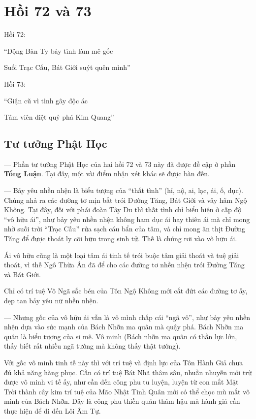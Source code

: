 \chapter{Hồi 72 và 73} %
\label{cha:hoi_72_73}

Hồi 72:

\begin{itshape}
``Động Bàn Ty bảy tình làm mê gốc

Suối Trạc Cấu, Bát Giới suýt quên mình''
\end{itshape}

Hồi 73:

\begin{itshape}
``Giận cũ vì tình gây độc ác

Tâm viên diệt quỷ phá Kim Quang''
\end{itshape}

\section{Tư tưởng Phật Học} %
\label{sec:72_73_phat_hoc}

— Phần tư tưởng Phật Học của hai hồi 72 và 73 này đã được đề cập ở phần {\bf Tổng Luận}. Tại đây, một vài điểm nhận xét khác sẽ được bàn đến.

— Bảy yêu nhền nhện là biểu tượng của ``thất tình'' (hỉ, nộ, ai, lạc, ái, ố, dục). Chúng nhả ra các đường tơ mịn bắt trói Đường Tăng, Bát Giới và vây hãm Ngộ Không. Tại đây, đối với phái đoàn Tây Du thì thất tình chỉ biểu hiện ở cấp độ ``vô hữu ái'', như bảy yêu nhền nhện không ham dục ái hay thiên ái mà chỉ mong nhờ suối trời ``Trạc Cấu'' rửa sạch cáu bẩn của tâm, và chỉ mong ăn thịt Đường Tăng để được thoát ly cõi hữu trong sinh tử. Thế là chúng rơi vào vô hữu ái.

Ái vô hữu cũng là một loại tâm ái tinh tế trói buộc tâm giải thoát và tuệ giải thoát, vì thế Ngô Thừa Ân đã để cho các đường tơ nhền nhện trói Đường Tăng và Bát Giới.

Chỉ có trí tuệ Vô Ngã sắc bén của Tôn Ngộ Không mới cắt đứt các đường tơ ấy, dẹp tan bảy yêu nữ nhền nhện.

— Nhưng gốc của vô hữu ái vẫn là vô mình chấp cái ``ngã vô'', như bảy yêu nhền nhện dựa vào sức mạnh của Bách Nhỡn ma quân mà quậy phá. Bách Nhỡn ma quân là biểu tượng của si mê. Vô minh (Bách nhỡn ma quân có thần lực lớn, thấy biết rất nhiều ngã tướng mà không thấy thật tướng).

Với gốc vô minh tinh tế này thì với trí tuệ và định lực của Tôn Hành Giả chưa đủ khả năng hàng phục. Cần có trí tuệ Bát Nhã thâm sâu, nhuần nhuyễn mới trừ được vô minh vi tế ấy, như cần đến công phu tu luyện, luyện từ con mắt Mặt Trời thành cây kim trí tuệ của Mão Nhật Tinh Quân mới có thể chọc mù mắt vô minh của Bách Nhỡn. Đây là công phu thiền quán thâm hậu mà hành giả cần thực hiện để đi đến Lôi Âm Tự.

